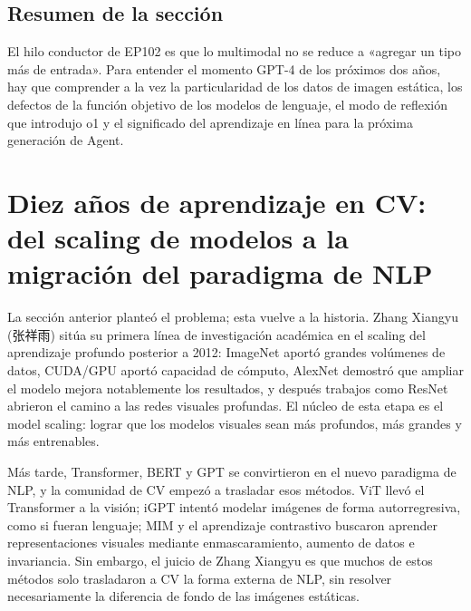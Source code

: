 \documentclass[a4paper]{article}
\begin{document}
\subsection{Resumen de la sección}

El hilo conductor de EP102 es que lo multimodal no se reduce a «agregar un tipo más de entrada». Para entender el momento GPT-4 de los próximos dos años, hay que comprender a la vez la particularidad de los datos de imagen estática, los defectos de la función objetivo de los modelos de lenguaje, el modo de reflexión que introdujo o1 y el significado del aprendizaje en línea para la próxima generación de Agent.
\section{Diez años de aprendizaje en CV: del scaling de modelos a la migración del paradigma de NLP}

La sección anterior planteó el problema; esta vuelve a la historia. Zhang Xiangyu (张祥雨) sitúa su primera línea de investigación académica en el scaling del aprendizaje profundo posterior a 2012: ImageNet aportó grandes volúmenes de datos, CUDA/GPU aportó capacidad de cómputo, AlexNet demostró que ampliar el modelo mejora notablemente los resultados, y después trabajos como ResNet abrieron el camino a las redes visuales profundas. El núcleo de esta etapa es el model scaling: lograr que los modelos visuales sean más profundos, más grandes y más entrenables.

Más tarde, Transformer, BERT y GPT se convirtieron en el nuevo paradigma de NLP, y la comunidad de CV empezó a trasladar esos métodos. ViT llevó el Transformer a la visión; iGPT intentó modelar imágenes de forma autorregresiva, como si fueran lenguaje; MIM y el aprendizaje contrastivo buscaron aprender representaciones visuales mediante enmascaramiento, aumento de datos e invariancia. Sin embargo, el juicio de Zhang Xiangyu es que muchos de estos métodos solo trasladaron a CV la forma externa de NLP, sin resolver necesariamente la diferencia de fondo de las imágenes estáticas.
\end{document}
